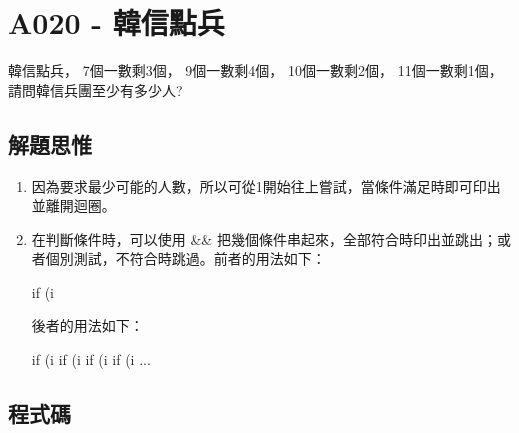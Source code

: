 \section{A020 - 韓信點兵}
韓信點兵， 7個一數剩3個， 9個一數剩4個， 10個一數剩2個， 11個一數剩1個， 請問韓信兵團至少有多少人?

\subsection{解題思惟}
\begin{enumerate}
	\item 因為要求最少可能的人數，所以可從1開始往上嘗試，當條件滿足時即可印出並離開迴圈。
	\item 在判斷條件時，可以使用 \&\& 把幾個條件串起來，全部符合時印出並跳出；或者個別測試，不符合時跳過。前者的用法如下：
	\begin{inside}
		if (i%
	\end{inside}
	後者的用法如下：
	\begin{inside}
		if (i%
		if (i%
		if (i%
		if (i%
		...
	\end{inside}
\end{enumerate}


\subsection{程式碼}

